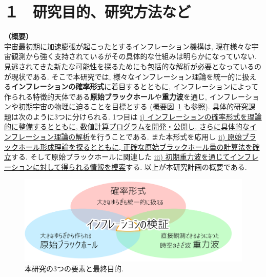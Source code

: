 \documentclass[11pt,a4paper,uplatex,dvipdfmx]{ujarticle} 		%
\newcommand{\研究課題名}{確率解析・原始ブラックホール・重力波観測から迫るインフレーション}
\newcommand{\研究機関名}{名古屋大学}
\newcommand{\研究代表者氏名}{多田祐一郎}
\newcommand{\研究期間の最終元号年度}{6}  %
\renewcommand{\emph}[1]{{\sffamily\gtfamily\bfseries #1}}
\begin{document}
\mgfamily\sffamily


\section{１　研究目的、研究方法など}

\noindent
\textbf{（概要）}\\
	
\noindent
宇宙最初期に加速膨張が起こったとするインフレーション機構は, 
現在様々な宇宙観測から強く支持されているがその具体的な仕組みは明らかになっていない.
見逃されてきた新たな可能性を探るためにも包括的な解析が必要となっているのが現状である.
そこで本研究では, 様々なインフレーション理論を統一的に扱える\emph{インフレーションの確率形式}に着目するとともに,
インフレーションによって作られる特徴的天体である\emph{原始ブラックホール}や\emph{重力波}を通じ,
インフレーションや初期宇宙の物理に迫ることを目標とする (概要図~\ref{fig: abstract} も参照).
具体的研究課題は次のように3つに分けられる.
1つ目は \ul{i) インフレーションの確率形式を理論的に整備するとともに, 数値計算プログラムを開発・公開し, 
さらに具体的なインフレーション理論の解析}を行うことである.
また本形式を応用し \ul{ii) 原始ブラックホール形成理論を探るとともに, 正確な原始ブラックホール量の計算法を確立}する. 
そして原始ブラックホールに関連した \ul{iii) 初期重力波を通じてインフレーションに対して得られる情報を模索}する. 
以上が本研究計画の概要である.


\begin{figure}[h]
	\centering
	\includegraphics[width=0.7\hsize]{YLC2020_abstract.pdf}
	\caption{本研究の3つの要素と最終目的.}
	\label{fig: abstract}
\end{figure}



	
\vspace*{1zw}	%
\end{document}
